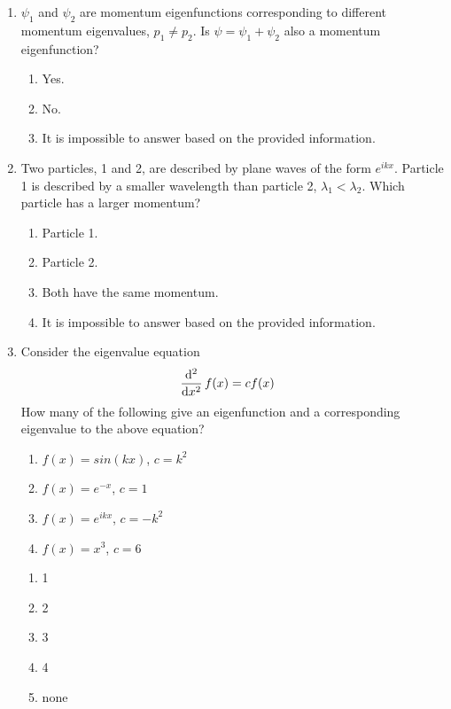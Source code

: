 \documentclass[fleqn, a4paper, 11pt, oneside]{amsart}
\theoremstyle{definition}
\theoremstyle{theorem}
\begin{document}
\begin{question}
	\begin{enumerate}
		\item
			$\psi_1$ and $\psi_2$ are momentum eigenfunctions corresponding to different momentum eigenvalues, $p_1 \neq p_2$.
	Is $\psi = \psi_1 + \psi_2$ also a momentum eigenfunction?
			\begin{enumerate}
				\item Yes.
				\item No.
				\item It is impossible to answer based on the provided information.
			\end{enumerate}
		\item
			Two particles, 1 and 2, are described by plane waves of the form $e^{i k x}$.
			Particle 1 is described by a smaller wavelength than particle 2, $\lambda_1 < \lambda_2$.
			Which particle has a larger momentum?
			\begin{enumerate}
				\item Particle 1.
				\item Particle 2.
				\item Both have the same momentum.
				\item It is impossible to answer based on the provided information.
			\end{enumerate}
		\item
			Consider the eigenvalue equation
			\begin{align*}
				\dod[2]{}{x}f(x) & = c f(x)
			\end{align*}
			How many of the following give an eigenfunction and a corresponding eigenvalue to the above equation?
			\begin{enumerate}
				\item $f(x) = sin(k x)$, $c = k^2$
				\item $f(x) = e^{-x}$, $c = 1$
				\item $f(x) = e^{i k x}$, $c = -k^2$
				\item $f(x) = x^3$, $c = 6$
			\end{enumerate}
			\begin{enumerate}
				\item 1
				\item 2
				\item 3
				\item 4
				\item none
			\end{enumerate}
	\end{enumerate}
\end{question}
\end{document}
